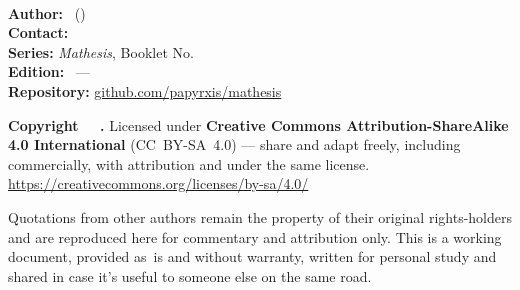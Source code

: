 \thispagestyle{empty}
\vspace*{0.8cm}
\begin{flushleft}
{\small\linespread{1.3}\selectfont

\textbf{\BookletTitle}\\[0.2em]
{\color{textsecondary}\BookletSubtitle}

\vspace{0.9em}

\textbf{Author:}   \BookletAuthor\ (\BookletAuthorHandle)\\
\textbf{Contact:}  \href{mailto:\BookletEmail}{\BookletEmail}\\
\textbf{Series:}   \textit{Mathesis}, Booklet No.\,\BookletNumber\\
\textbf{Edition:}  \BookletEdition\ --- \BookletYear\\
\textbf{Repository:} \href{https://github.com/papyrxis/mathesis}{github.com/papyrxis/mathesis}

\vspace{0.9em}

\textbf{Copyright \textcopyright\ \BookletYear\ \BookletAuthor.}
Licensed under \textbf{Creative Commons Attribution-ShareAlike 4.0
International} (CC~BY-SA~4.0) --- share and adapt freely, including
commercially, with attribution and under the same license.
\url{https://creativecommons.org/licenses/by-sa/4.0/}

\vspace{0.7em}

Quotations from other authors remain the property of their original
rights-holders and are reproduced here for commentary and attribution
only. This is a working document, provided as~is and without warranty,
written for personal study and shared in case it's useful to someone
else on the same road.

}
\end{flushleft}
\clearpage
